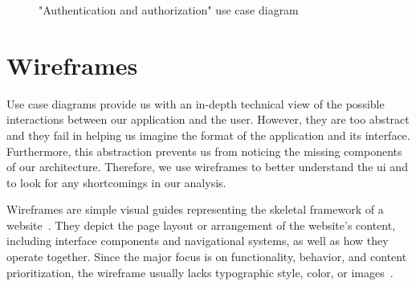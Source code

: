 \begin{figure}[H]
  \centerfloat
  \sffamily

  \caption{"Authentication and authorization" use case diagram}
  \label{fig:auth-use-case-diagram}
\end{figure}


\section{Wireframes}
Use case diagrams provide us with an in-depth technical view of the possible interactions between our application and the user.
However, they are too abstract and they fail in helping us imagine the format of the application and its interface.
Furthermore, this abstraction prevents us from noticing the missing components of our architecture.
Therefore, we use wireframes to better understand the \acrfull{ui} and to look for any shortcomings in our analysis.

Wireframes are simple visual guides representing the skeletal framework of a website~\autocite{gemayel_how_nodate}.
They depict the page layout or arrangement of the website's content, including interface components and navigational systems, as well as how they operate together.
Since the major focus is on functionality, behavior, and content prioritization, the wireframe usually lacks typographic style, color, or images~\autocite{garrett_elements_2011}.

